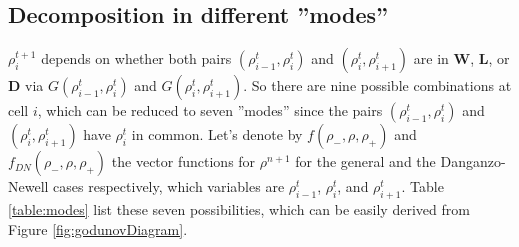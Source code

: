 \documentclass[11pt]{article}
\numberwithin{equation}{section}
\numberwithin{figure}{section}
\numberwithin{table}{section}
\begin{document}
\subsection{Decomposition in different ''modes''}\label{sec:decompositionModes}

$\rho^{t+1}_{i}$ depends on whether both pairs $(\rho^{t}_{i-1}, \rho^{t}_{i})$ and $(\rho^{t}_{i}, \rho^{t}_{i+1})$ are in \textbf{W}, \textbf{L}, or \textbf{D} via $G(\rho^{t}_{i-1},\rho^{t}_{i})$ and $G(\rho^{t}_{i},\rho^{t}_{i+1})$. So there are nine possible combinations at cell $i$, which can be reduced to seven ''modes'' since the pairs $(\rho^{t}_{i-1}, \rho^{t}_{i})$ and $(\rho^{t}_{i}, \rho^{t}_{i+1})$ have $\rho^{t}_{i}$ in common. Let's denote by $f(\rho_{-},\rho,\rho_{+})$ and $f_{DN}(\rho_{-},\rho,\rho_{+})$ the vector functions for $\rho^{n+1}$ for the general and the Danganzo-Newell cases respectively, which variables are $\rho^{t}_{i-1}$, $\rho^{t}_{i}$, and $\rho^{t}_{i+1}$. Table \ref{table:modes} list these seven possibilities, which can be easily derived from Figure \ref{fig:godunovDiagram}.
\end{document}
